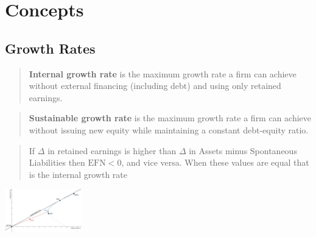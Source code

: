 \section{Concepts}
\subsection{Growth Rates}
\blockquote{\textbf{Internal growth rate} is the maximum growth rate a
firm can achieve without external financing (including debt) and using
only retained earnings.}

\blockquote{\textbf{Sustainable growth rate} is the maximum growth rate
a firm can achieve without issuing new equity while maintaining a
constant debt-equity ratio.}

\blockquote{If $\Delta$ in retained earnings is higher than $\Delta$ in
Assets minus Spontaneous Liabilities then $\mathrm{EFN} < 0$, and vice
versa. When these values are equal that is the internal growth rate}

\begin{center}
  \includegraphics[width=0.25\textwidth]{images/portfolio-analysis.png}
\end{center}